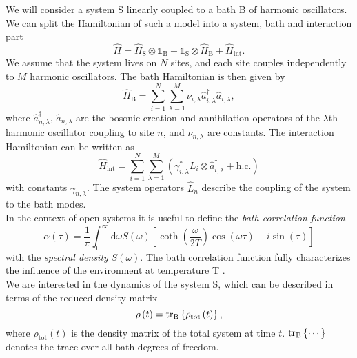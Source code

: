 We will consider a system S linearly coupled to a bath B of harmonic oscillators. 
We can split the Hamiltonian of such a model into a system, bath and interaction part
\begin{equation*}
    \hat{H} = \hat{H}_\text{S} \otimes \mathbb{1}_\text{B} + \mathbb{1}_\text{S} \otimes \hat{H}_\text{B}
    + \hat{H}_\text{int}.
\end{equation*}
We assume that the system lives on $N$ sites, and each site couples independently to $M$
harmonic oscillators. The bath Hamiltonian is then given by
\begin{equation*}
    \hat{H}_\text{B} = \sum_{i=1}^{N}\sum_{\lambda=1}^{M}\nu_{i, \lambda} 
    \hat{a}^\dagger_{i, \lambda} \hat{a}_{i, \lambda},
\end{equation*}
where $\hat{a}^\dagger_{n,\lambda}$, $\hat{a}_{n,\lambda}$ are the bosonic creation and annihilation
operators of the $\lambda$th harmonic oscillator coupling to site $n$, and $\nu_{n,\lambda}$ 
are constants. The interaction Hamiltonian can be written as
\begin{equation*}
    \hat{H}_\text{int} = \sum_{i=1}^{N}\sum_{\lambda=1}^{M} \left( \gamma_{i,\lambda}^*
    L_i \otimes \hat{a}_{i,\lambda}^\dagger + \text{h.c.} \right)
\end{equation*}
with constants $\gamma_{n,\lambda}$. The system operators $\hat{L}_n$ describe the coupling
of the system to the bath modes.
\\
In the context of open systems it is useful to 
define the \textit{bath correlation function}
\begin{equation*}
    \alpha(\tau) = \frac{1}{\pi} \int_0^\infty \text{d}\omega S(\omega) 
    \left[\coth\left(\frac{\omega}{2T}\right)\cos\left(\omega\tau\right)-i\sin\left(\tau\right)\right]
\end{equation*}
with the \textit{spectral density} $S\left(\omega\right)$. The bath correlation function fully
characterizes the influence of the environment at temperature T \cite{Gao:2022}.
\\
We are interested in the dynamics of the system S, which can be described in terms of the reduced
density matrix
\begin{equation*}
    \rho\left(t\right) = \trace_\text{B}\left\{\rho_\text{tot}\left(t\right)\right\},
\end{equation*}
where $\rho_\text{tot}\left(t\right)$ is the density matrix of the total system at time $t$.
$\trace_\text{B}\left\{\cdots\right\}$ denotes the trace over all bath degrees of freedom.

